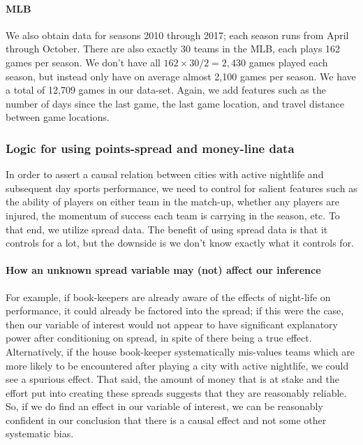\documentclass[letterpaper,12pt]{article}
\begin{document}
\paragraph{MLB} We also obtain data for seasons 2010 through 2017; each season runs from 
April through October. There are also exactly 30 teams in the MLB, each plays 162 games per season.
We don't have all $162 \times 30 / 2 = 2,430$ games played each season, but instead only have
on average almost 2,100 games per season. We have a total of 12,709 games in our data-set. Again,
we add features such as the number of days since the last game, the last game location, and travel
distance between game locations.

\subsubsection{Logic for using points-spread and money-line data}
In order to assert a causal relation between cities with active nightlife 
and subsequent day sports performance, we need to control for salient
features such as the ability of players on either team in the match-up,
whether any players are injured, the momentum of success each team is carrying
in the season, etc. To that end, we utilize spread data.\citep{anderson} The benefit of
using spread data is that it controls for a lot, but the downside is
we don't know exactly what it controls for.

\paragraph{How an unknown spread variable may (not) affect our inference}
For example, if book-keepers
are already aware of the effects of night-life on performance, it could
already be factored into the spread; if this were the case, then our variable
of interest would not appear to have significant explanatory power
after conditioning on spread, in spite of there being
a true effect. Alternatively,
if the house book-keeper systematically mis-values
teams which are more likely to be encountered after playing a city with active nightlife,
we could see a spurious effect. 
That said, the amount of money that is at stake and the effort put into creating these spreads 
suggests that they are reasonably reliable. 
So, if we do find an effect in our variable of interest,
we can be reasonably confident in our conclusion that there is a causal effect and not some other systematic bias.
\end{document}

